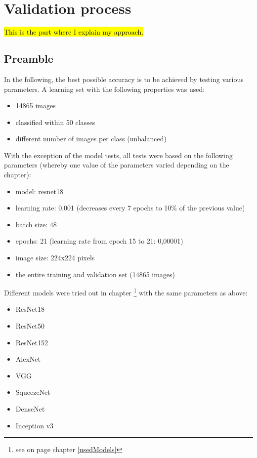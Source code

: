 \documentclass[10pt]{article}
\begin{document}
	\section{Validation process}

		\hl{This is the part where I explain my approach.}
	
		\subsection{Preamble}
			In the following, the best possible accuracy is to be achieved by testing various parameters.
			A learning set with the following properties was used:
	
			\begin{itemize}
				\item 14865 images
				\item classified within 50 classes
				\item different number of images per class (unbalanced)
			\end{itemize}
	
			With the exception of the model tests, all tests were based on the following parameters
			(whereby one value of the parameters varied depending on the chapter):
		
			\begin{itemize}
				\item model: resnet18
				\item learning rate: 0,001 (decreases every 7 epochs to 10\% of the previous value)
				\item batch size: 48
				\item epochs: 21 (learning rate from epoch 15 to 21: 0,00001)
				\item image size: 224x224 pixels
				\item the entire training and validation set (14865 images)
			\end{itemize}
		
			Different models were tried out in chapter \flqq{}\footnote{
				see on page \pageref{usedModels}
				chapter \ref{usedModels}
				\flqq{}\frqq
			}\frqq{} with the same
			parameters as above:
		
			\begin{itemize}
				\item ResNet18
				\item ResNet50
				\item ResNet152
				\item AlexNet
				\item VGG
				\item SqueezeNet
				\item DenseNet
				\item Inception v3
			\end{itemize}
			
\end{document}
